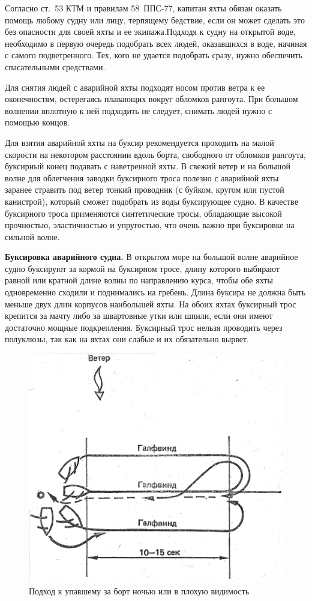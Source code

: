 \documentclass[a4paper, 12pt, twoside, final, book, russian, fittopage, cyremdash]{ncc}
\begin{document}
Согласно ст.~53 КТМ и правилам 58~ППС-77, капитан яхты обязан оказать помощь любому судну или лицу, терпящему бедствие, если он может сделать это без опасности для своей яхты и ее экипажа.Подходя к судну на открытой воде, необходимо в первую очередь подобрать всех людей, оказавшихся в воде, начиная с самого подветренного. Тех, кого не удается подобрать сразу, нужно обеспечить спасательными средствами.

Для снятия людей с аварийной яхты подходят носом против ветра к ее оконечностям, остерегаясь плавающих вокруг обломков рангоута. При большом волнении вплотную к ней подходить не следует, снимать людей нужно с помощью концов.

Для взятия аварийной яхты на буксир рекомендуется проходить на малой скорости на некотором расстоянии вдоль борта, свободного от обломков рангоута, буксирный конец подавать с наветренной яхты. В свежий ветер и на большой волне для облегчения заводки буксирного троса полезно с аварийной яхты заранее стравить под ветер тонкий проводник (с буйком, кругом или пустой канистрой), который сможет подобрать из воды буксирующее судно. В качестве буксирного троса применяются синтетические тросы, обладающие высокой прочностью, эластичностью и упругостью, что очень важно при буксировке на сильной волне. 

\textbf{Буксировка аварийного судна.} В открытом море на большой волне аварийное судно буксируют за кормой на буксирном тросе, длину которого выбирают равной или кратной длине волны по направлению курса, чтобы обе яхты одновременно сходили и поднимались на гребень. Длина буксира не должна быть меньше двух длин корпусов наибольшей яхты. На обоих яхтах буксирный трос крепится за мачту либо за швартовные утки или шпили, если они имеют достаточно мощные подкрепления. Буксирный трос нельзя проводить через полуклюзы, так как на яхтах они слабые и их обязательно вырвет. 

\begin{figure}[htb]
  \centering{}
  \includegraphics[scale=1.3]{0141P}
  \caption{Подход к упавшему за борт ночью или в плохую видимость}
  \label{fig:141}
\end{figure}
\end{document}
